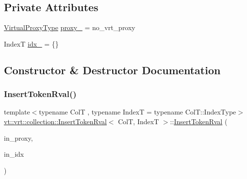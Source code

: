 \subsection*{Private Attributes}
\begin{DoxyCompactItemize}
\item 
\hyperlink{namespacevt_a1b417dd5d684f045bb58a0ede70045ac}{Virtual\+Proxy\+Type} \hyperlink{structvt_1_1vrt_1_1collection_1_1_insert_token_rval_a9eb736a9d35655244886202938b41a60}{proxy\+\_\+} = no\+\_\+vrt\+\_\+proxy
\item 
IndexT \hyperlink{structvt_1_1vrt_1_1collection_1_1_insert_token_rval_a24f53a4a29fa2a3ef166619b7e9ba4f2}{idx\+\_\+} = \{\}
\end{DoxyCompactItemize}


\subsection{Constructor \& Destructor Documentation}
\mbox{\label{structvt_1_1vrt_1_1collection_1_1_insert_token_rval_a346da7d8d739227c8918399c43095e16}} 
\subsubsection{\texorpdfstring{Insert\+Token\+Rval()}{InsertTokenRval()}\hspace{0.1cm}{\footnotesize\ttfamily [1/3]}}
{\footnotesize\ttfamily template$<$typename ColT , typename IndexT  = typename Col\+T\+::\+Index\+Type$>$ \\
\hyperlink{structvt_1_1vrt_1_1collection_1_1_insert_token_rval}{vt\+::vrt\+::collection\+::\+Insert\+Token\+Rval}$<$ ColT, IndexT $>$\+::\hyperlink{structvt_1_1vrt_1_1collection_1_1_insert_token_rval}{Insert\+Token\+Rval} (\begin{DoxyParamCaption}\item[{\hyperlink{namespacevt_a1b417dd5d684f045bb58a0ede70045ac}{Virtual\+Proxy\+Type} const \&}]{in\+\_\+proxy,  }\item[{IndexT}]{in\+\_\+idx }\end{DoxyParamCaption})\hspace{0.3cm}{\ttfamily [inline]}}

